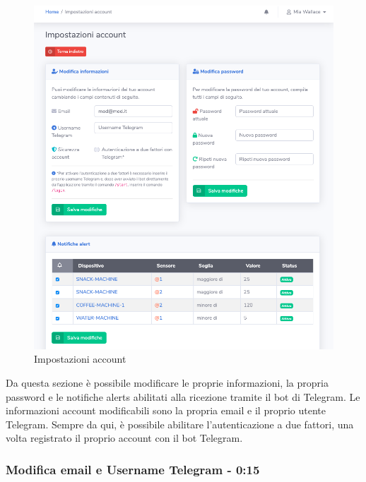 	\begin{figure}[H]
		\centering
		\includegraphics[scale=0.600]{res/images/membro/impostazioni.png}
		\caption{Impostazioni account}
	\end{figure}
	Da questa sezione è possibile modificare le proprie informazioni, la propria password e le notifiche alerts abilitati alla ricezione tramite il bot di Telegram.
	Le informazioni account modificabili sono la propria email e il proprio utente Telegram. Sempre da qui, è possibile abilitare l’autenticazione a due fattori, una volta registrato il proprio account con il bot Telegram.


	\subsubsection{Modifica email e Username Telegram - 0:15}


